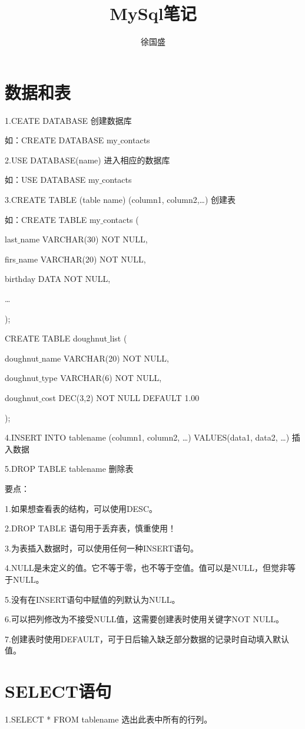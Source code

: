 \documentclass[UTF8]{ctexart}
\title{MySql笔记}
\author{徐国盛}
\begin{document}
\maketitle
\tableofcontents
\section{数据和表}
1.CEATE DATABASE 创建数据库

如：CREATE DATABASE my$\_$contacts

2.USE DATABASE(name) 进入相应的数据库

如：USE DATABASE my$\_$contacts

3.CREATE TABLE (table name) (column1, column2,\dots)  创建表

如：CREATE TABLE my$\_$contacts (

			last$\_$name VARCHAR(30) NOT NULL,

			firs$\_$name VARCHAR(20) NOT NULL,

			birthday DATA NOT NULL,

			\dots

			);

CREATE TABLE doughnut$\_$list (

			 doughnut$\_$name VARCHAR(20) NOT NULL,
 
			 doughnut$\_$type VARCHAR(6) NOT NULL,

			 doughnut$\_$cost DEC(3,2) NOT NULL DEFAULT 1.00

 );

4.INSERT INTO tablename (column1, column2, \dots) VALUES(data1, data2, \dots) 插入数据

5.DROP TABLE tablename 删除表

要点：

1.如果想查看表的结构，可以使用DESC。

2.DROP TABLE 语句用于丢弃表，慎重使用！

3.为表插入数据时，可以使用任何一种INSERT语句。

4.NULL是未定义的值。它不等于零，也不等于空值。值可以是NULL，但觉非等于NULL。

5.没有在INSERT语句中赋值的列默认为NULL。

6.可以把列修改为不接受NULL值，这需要创建表时使用关键字NOT NULL。

7.创建表时使用DEFAULT，可于日后输入缺乏部分数据的记录时自动填入默认值。
\section{SELECT语句}
1.SELECT * FROM tablename 选出此表中所有的行列。
\end{document}
